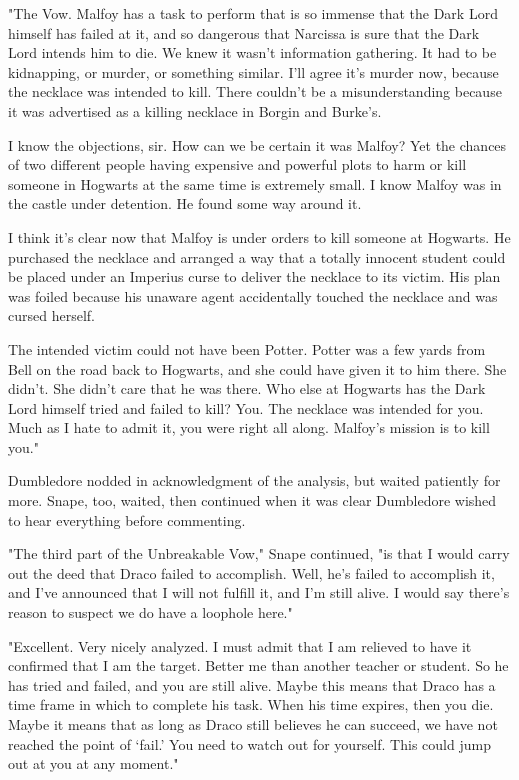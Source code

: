 "The Vow. Malfoy has a task to perform that is so immense that the Dark Lord himself has failed at it, and so dangerous that Narcissa is sure that the Dark Lord intends him to die. We knew it wasn't information gathering. It had to be kidnapping, or murder, or something similar. I'll agree it's murder now, because the necklace was intended to kill. There couldn't be a misunderstanding because it was advertised as a killing necklace in Borgin and Burke's.

\textooquote I know the objections, sir. How can we be certain it was Malfoy? Yet the chances of two different people having expensive and powerful plots to harm or kill someone in Hogwarts at the same time is extremely small. I know Malfoy was in the castle under detention. He found some way around it.

\textooquote I think it's clear now that Malfoy is under orders to kill someone at Hogwarts. He purchased the necklace and arranged a way that a totally innocent student could be placed under an Imperius curse to deliver the necklace to its victim. His plan was foiled because his unaware agent accidentally touched the necklace and was cursed herself.

\textooquote The intended victim could not have been Potter. Potter was a few yards from Bell on the road back to Hogwarts, and she could have given it to him there. She didn't. She didn't care that he was there. Who else at Hogwarts has the Dark Lord himself tried and failed to kill? You. The necklace was intended for you. Much as I hate to admit it, you were right all along. Malfoy's mission is to kill you."

Dumbledore nodded in acknowledgment of the analysis, but waited patiently for more. Snape, too, waited, then continued when it was clear Dumbledore wished to hear everything before commenting.

"The third part of the Unbreakable Vow," Snape continued, "is that I would carry out the deed that Draco failed to accomplish. Well, he's failed to accomplish it, and I've announced that I will not fulfill it, and I'm still alive. I would say there's reason to suspect we do have a loophole here."

"Excellent. Very nicely analyzed. I must admit that I am relieved to have it confirmed that I am the target. Better me than another teacher or student. So he has tried and failed, and you are still alive. Maybe this means that Draco has a time frame in which to complete his task. When his time expires, then you die. Maybe it means that as long as Draco still believes he can succeed, we have not reached the point of `fail.' You need to watch out for yourself. This could jump out at you at any moment."

